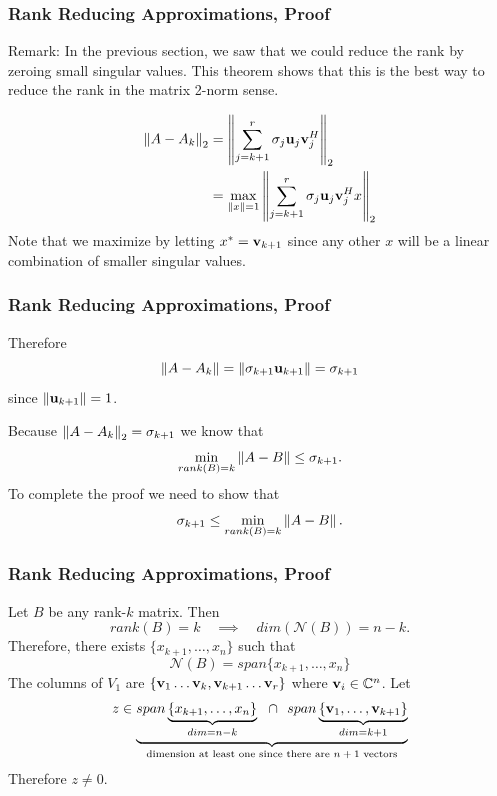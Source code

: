 \documentclass{beamer}
\begin{document}
\begin{frame}\frametitle{Rank Reducing Approximations, Proof}
	{\color{blue}Remark:} In the previous section, we saw that we could reduce the rank by zeroing small singular values.  This theorem shows that this is the best way to reduce the rank in the matrix 2-norm sense.	

	\begin{proofstart}
		\begin{align*}
			\left\|A-A_k \right\|_2 
				&= \left\|\sum_{j=k+1}^r\sigma_j\mathbf{u}_j\mathbf{v}_j^H \right\|_2 \\
				&= \max_{\left\|x \right\|=1}\left\|\sum_{j=k+1}^r\sigma_j\mathbf{u}_j\mathbf{v}_j^Hx \right\|_2
		\end{align*}
		Note that we maximize by letting $x^\ast = \mathbf{v}_{k+1}$ since any other $x$ will be a linear combination of smaller singular values.	
	\end{proofstart}
\end{frame}

\begin{frame}\frametitle{Rank Reducing Approximations, Proof}
	Therefore
	\[ 
		\left\|A-A_k\right\| = \left\|\sigma_{k+1 }\mathbf{u}_{k+1}\right\| = \sigma_{k+1} 
	\]
	since $\left\|\mathbf{u}_{k+1}\right\| = 1$.
	
	\vfill
	
	Because $\left\|A-A_k \right\|_2 = \sigma_{k+1}$ we know that
	\[ 
		\min_{rank(B)=k}\left\|A-B \right\| \leq \sigma_{k+1}.
	\]
	To complete the proof we need to show that
	\[ 
		\sigma_{k+1} \leq \min_{rank(B)=k}\left\|A-B \right\|.
	\]	
\end{frame}

\begin{frame}\frametitle{Rank Reducing Approximations, Proof}
	Let $B$ be any rank-$k$ matrix.  Then 
	\[
		rank(B)=k \quad \implies \quad dim(\mathcal{N}(B))=n-k.
	\]
	Therefore, there exists $ \{x_{k+1},\ldots,x_n\} $ such that
	\[ 
		\mathcal{N}(B) = span\{x_{k+1}, \ldots, x_n \}
	\]
	The columns of $V_1$ are $\{\mathbf{v}_1\ldots \mathbf{v}_k,\mathbf{v}_{k+1}\ldots \mathbf{v}_r\}$ where $\mathbf{v}_i \in \mathbb{C}^n$.
	Let 
	\[
		z \in 
			\underbrace{
				span\underbrace{
						\{x_{k+1},\ldots,x_n\}
					}_{dim=n-k} 
					~~\cap~~ 
				span\underbrace{
						\{\mathbf{v}_1,\ldots,\mathbf{v}_{k+1}\}
					}_{dim=k+1}
			}_{\text{dimension at least one since there are $n+1$ vectors}
			} 
	\]
	Therefore $z \neq 0$.
\end{frame}
\end{document}
